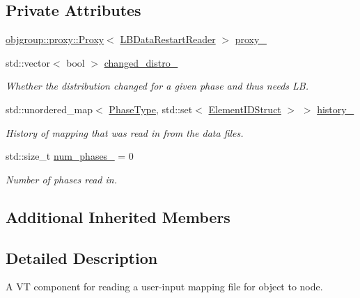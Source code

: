\subsection*{Private Attributes}
\begin{DoxyCompactItemize}
\item 
\hyperlink{structvt_1_1objgroup_1_1proxy_1_1_proxy}{objgroup\+::proxy\+::\+Proxy}$<$ \hyperlink{structvt_1_1vrt_1_1collection_1_1balance_1_1_l_b_data_restart_reader}{L\+B\+Data\+Restart\+Reader} $>$ \hyperlink{structvt_1_1vrt_1_1collection_1_1balance_1_1_l_b_data_restart_reader_a65b1a0379efca529b3ce6cff045e047a}{proxy\+\_\+}
\item 
std\+::vector$<$ bool $>$ \hyperlink{structvt_1_1vrt_1_1collection_1_1balance_1_1_l_b_data_restart_reader_ade00b90a9eeee5d3dd05edee5d24e5a9}{changed\+\_\+distro\+\_\+}
\begin{DoxyCompactList}\small\item\em Whether the distribution changed for a given phase and thus needs LB. \end{DoxyCompactList}\item 
std\+::unordered\+\_\+map$<$ \hyperlink{namespacevt_a46ce6733d5cdbd735d561b7b4029f6d7}{Phase\+Type}, std\+::set$<$ \hyperlink{namespacevt_1_1vrt_1_1collection_1_1balance_a9f5b53fafb270212279a4757d2c4cd28}{Element\+I\+D\+Struct} $>$ $>$ \hyperlink{structvt_1_1vrt_1_1collection_1_1balance_1_1_l_b_data_restart_reader_a9c81d77c260abc1a4a203dd2c9f560a4}{history\+\_\+}
\begin{DoxyCompactList}\small\item\em History of mapping that was read in from the data files. \end{DoxyCompactList}\item 
std\+::size\+\_\+t \hyperlink{structvt_1_1vrt_1_1collection_1_1balance_1_1_l_b_data_restart_reader_a8a9f63f593ce73388ca9b2da4b705b98}{num\+\_\+phases\+\_\+} = 0
\begin{DoxyCompactList}\small\item\em Number of phases read in. \end{DoxyCompactList}\end{DoxyCompactItemize}
\subsection*{Additional Inherited Members}


\subsection{Detailed Description}
A VT component for reading a user-\/input mapping file for object to node. 

